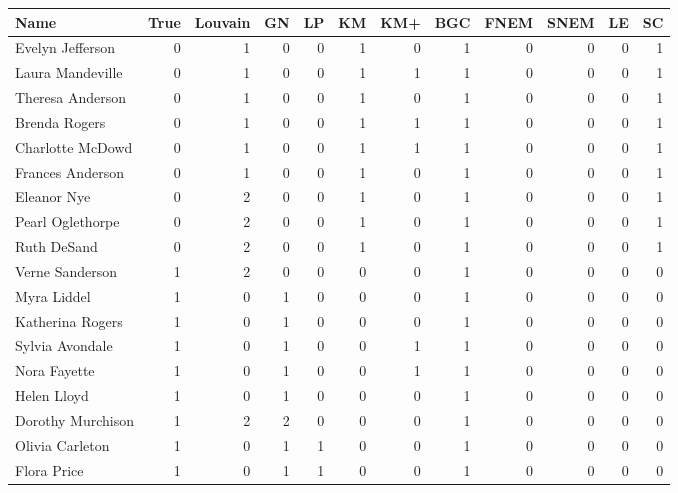 \begin{tabular}{lrrrrrrrrrrr}
\toprule
Name & True & Louvain & GN & LP & KM & KM+ & BGC & FNEM & SNEM & LE & SC \\
\midrule
Evelyn Jefferson & 0 & 1 & 0 & 0 & 1 & 0 & 1 & 0 & 0 & 0 & 1 \\
Laura Mandeville & 0 & 1 & 0 & 0 & 1 & 1 & 1 & 0 & 0 & 0 & 1 \\
Theresa Anderson & 0 & 1 & 0 & 0 & 1 & 0 & 1 & 0 & 0 & 0 & 1 \\
Brenda Rogers & 0 & 1 & 0 & 0 & 1 & 1 & 1 & 0 & 0 & 0 & 1 \\
Charlotte McDowd & 0 & 1 & 0 & 0 & 1 & 1 & 1 & 0 & 0 & 0 & 1 \\
Frances Anderson & 0 & 1 & 0 & 0 & 1 & 0 & 1 & 0 & 0 & 0 & 1 \\
Eleanor Nye & 0 & 2 & 0 & 0 & 1 & 0 & 1 & 0 & 0 & 0 & 1 \\
Pearl Oglethorpe & 0 & 2 & 0 & 0 & 1 & 0 & 1 & 0 & 0 & 0 & 1 \\
Ruth DeSand & 0 & 2 & 0 & 0 & 1 & 0 & 1 & 0 & 0 & 0 & 1 \\
Verne Sanderson & 1 & 2 & 0 & 0 & 0 & 0 & 1 & 0 & 0 & 0 & 0 \\
Myra Liddel & 1 & 0 & 1 & 0 & 0 & 0 & 1 & 0 & 0 & 0 & 0 \\
Katherina Rogers & 1 & 0 & 1 & 0 & 0 & 0 & 1 & 0 & 0 & 0 & 0 \\
Sylvia Avondale & 1 & 0 & 1 & 0 & 0 & 1 & 1 & 0 & 0 & 0 & 0 \\
Nora Fayette & 1 & 0 & 1 & 0 & 0 & 1 & 1 & 0 & 0 & 0 & 0 \\
Helen Lloyd & 1 & 0 & 1 & 0 & 0 & 0 & 1 & 0 & 0 & 0 & 0 \\
Dorothy Murchison & 1 & 2 & 2 & 0 & 0 & 0 & 1 & 0 & 0 & 0 & 0 \\
Olivia Carleton & 1 & 0 & 1 & 1 & 0 & 0 & 1 & 0 & 0 & 0 & 0 \\
Flora Price & 1 & 0 & 1 & 1 & 0 & 0 & 1 & 0 & 0 & 0 & 0 \\
\bottomrule
\end{tabular}
